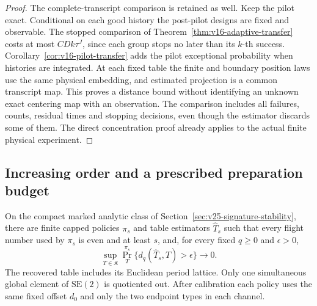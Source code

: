 \begin{proof}
The complete-transcript comparison is retained as well.  Keep the pilot
exact.  Conditional on each good history the post-pilot designs are fixed
and observable.  The stopped comparison of
Theorem~\ref{thm:v16-adaptive-transfer} costs at most \(CDk\tau^J\), since
each group stops no later than its \(k\)-th success.
Corollary~\ref{cor:v16-pilot-transfer} adds the pilot exceptional probability
when histories are integrated.  At each fixed table the finite and boundary
position laws use the same physical embedding, and estimated projection is
a common transcript map.  This proves a distance bound without identifying
an unknown exact centering map with an observation.  The comparison includes
all failures, counts, residual times and stopping decisions, even though the
estimator discards some of them.  The direct concentration proof already
applies to the actual finite physical experiment.
\end{proof}

\subsection{Increasing order and a prescribed preparation budget}

\begin{theorem}
\label{thm:v26-global-physical-reconstruction}
\label{thm:v25-global-physical-reconstruction}
\label{thm:v24-physical-global-reconstruction}
On the compact marked analytic class of
Section~\ref{sec:v25-signature-stability}, there are finite capped policies
\(\pi_s\) and table estimators \(\widehat T_s\) such that every flight
number used by \(\pi_s\) is even and at least \(s\), and, for every fixed
\(q\ge0\) and \(\epsilon>0\),
\begin{equation}\label{eq:v25-global-risk}
 \sup_{T\in\mathfrak K}\Pr_T^{\pi_s}
                    \{d_q(\widehat T_s,T)>\epsilon\}\longrightarrow0.
\end{equation}
The recovered table includes its Euclidean period lattice.  Only one
simultaneous global element of \(\mathrm{SE}(2)\) is quotiented out.
After calibration each policy uses the same fixed offset \(d_0\) and only
the two endpoint types in each channel.
\end{theorem}

